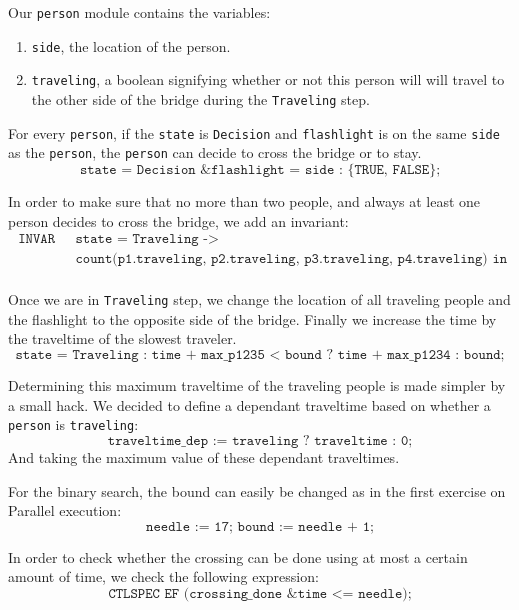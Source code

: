 \documentclass[12pt]{article}
\begin{document}
Our \texttt{person} module contains the variables:
\begin{enumerate}
\item \texttt{side}, the location of the person.
\item \texttt{traveling}, a boolean signifying whether or not this person will will travel to the other side of the bridge during the \texttt{Traveling} step.
\end{enumerate}

For every \texttt{person}, if the \texttt{state} is \texttt{Decision} and \texttt{flashlight} is on the same \texttt{side} as the \texttt{person}, the \texttt{person} can decide to cross the bridge or to stay.
\[ \texttt{state = Decision \& flashlight = side : \{TRUE, FALSE\};} \]

In order to make sure that no more than two people, and always at least one person decides to cross the bridge, we add an invariant:
\[
    \begin{array}{ll}
        \texttt{ INVAR } & \texttt{ state = Traveling -> } \\
        & \texttt{ count(p1.traveling, p2.traveling, p3.traveling, p4.traveling) in 1..2; } \\
    \end{array}
\]

Once we are in \texttt{Traveling} step, we change the location of all traveling people and the flashlight to the opposite side of the bridge. Finally we increase the time by the traveltime of the slowest traveler.
\[ \texttt{state = Traveling : time + max\_p1235 < bound ? time + max\_p1234 : bound;} \]

Determining this maximum traveltime of the traveling people is made simpler by a small hack.
We decided to define a dependant traveltime based on whether a \texttt{person} is \texttt{traveling}:
\[ \texttt{traveltime\_dep := traveling ? traveltime : 0;} \]
And taking the maximum value of these dependant traveltimes.

For the binary search, the bound can easily be changed as in the first exercise on Parallel execution:
\[\texttt{needle := 17; bound := needle + 1;}\]

In order to check whether the crossing can be done using at most a certain amount of time, we check the following expression:
\[ \texttt{CTLSPEC EF (crossing\_done \& time <= needle);} \]
\end{document}
